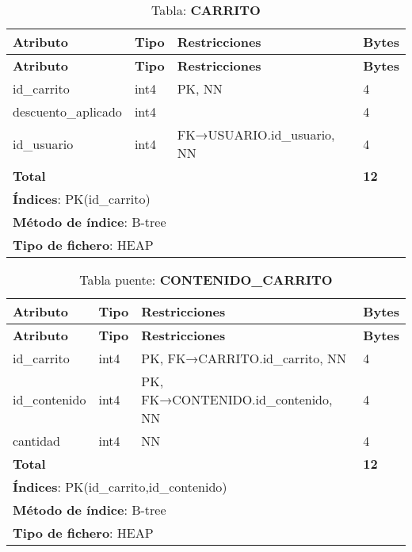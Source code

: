 \newpage
\begin{longtable}{|l|l|p{5cm}|p{5cm}|}
\caption{Tabla: \textbf{CARRITO}}\label{pf_carrito}\\ \hline
\textbf{Atributo} & \textbf{Tipo} & \textbf{Restricciones} & \textbf{Bytes}\\ \hline
\endfirsthead
\hline \textbf{Atributo} & \textbf{Tipo} & \textbf{Restricciones} & \textbf{Bytes}\\ \hline
\endhead
id\_carrito         & int4 & PK, NN                     & 4 \\ \hline
descuento\_aplicado & int4 &                             & 4 \\ \hline
id\_usuario         & int4 & FK→USUARIO.id\_usuario, NN & 4 \\ \hline
\textbf{Total} &      &                                & \textbf{12}\\ \hline
\multicolumn{4}{|l|}{\textbf{Índices}: PK(id\_carrito)} \\ \hline
\multicolumn{4}{|l|}{\textbf{Método de índice}: B-tree}\\ \hline
\multicolumn{4}{|l|}{\textbf{Tipo de fichero}: HEAP}\\ \hline
\end{longtable}

\begin{longtable}{|l|l|p{5cm}|p{5cm}|}
\caption{Tabla puente: \textbf{CONTENIDO\_CARRITO}}\label{pf_cont_carrito}\\ \hline
\textbf{Atributo} & \textbf{Tipo} & \textbf{Restricciones} & \textbf{Bytes}\\ \hline
\endfirsthead
\hline \textbf{Atributo} & \textbf{Tipo} & \textbf{Restricciones} & \textbf{Bytes}\\ \hline
\endhead
id\_carrito   & int4 & PK\*, FK→CARRITO.id\_carrito, NN     & 4 \\ \hline
id\_contenido & int4 & PK\*, FK→CONTENIDO.id\_contenido, NN & 4 \\ \hline
cantidad      & int4 & NN                                   & 4 \\ \hline
\textbf{Total} &      &                                     & \textbf{12}\\ \hline
\multicolumn{4}{|l|}{\textbf{Índices}: PK(id\_carrito,id\_contenido)} \\ \hline
\multicolumn{4}{|l|}{\textbf{Método de índice}: B-tree}\\ \hline
\multicolumn{4}{|l|}{\textbf{Tipo de fichero}: HEAP}\\ \hline
\end{longtable}

